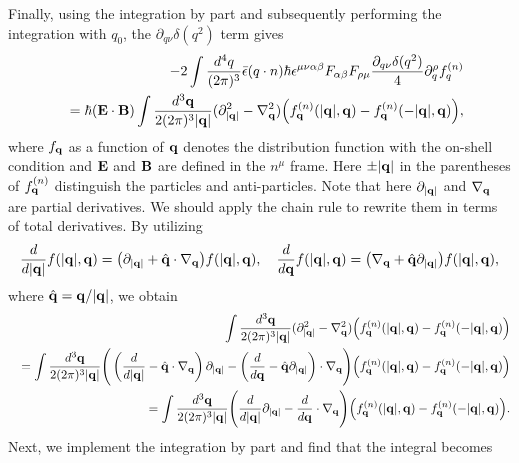 \documentclass[aps,prd,showkeys,preprint,amsmath,amssymb,nofootinbib]{revtex4-1}
\begin{document}
Finally, using the integration by part and subsequently performing the integration with $q_0$, the $\partial_{q\nu}\delta(q^2)$ term gives
\begin{eqnarray}\nonumber\label{chiral_anomaly}
&&-2\int\frac{d^4q}{(2\pi)^3}\bar{\epsilon}(q\cdot n)\hbar\epsilon^{\mu\nu\alpha\beta}F_{\alpha\beta}F_{\rho\mu}\frac{\partial_{q\nu}\delta(q^2)}{4}\partial^{\rho}_qf^{(n)}_q
\\
&&=\hbar({\bf E\cdot B})\int\frac{d^3{\bf q}}{2(2\pi)^3|{\bf q}|}
(\partial^2_{|{\bf q}|}-\nabla^2_{\bf q})\Big(f^{(n)}_{\bf q}(|{\bf q}|,{\bf q})-f^{(n)}_{\bf q}(-|{\bf q}|,{\bf q})\Big),
\end{eqnarray}
where $f_{\bf q}$ as a function of ${\bf q}$ denotes the distribution function with the on-shell condition and ${\bf E}$ and ${\bf B}$ are defined in the $n^{\mu}$ frame. Here $\pm|{\bf q}|$ in the parentheses of $f^{(n)}_{\bf q}$ distinguish the particles and anti-particles. %
Note that here $\partial_{|{\bf q}|}$ and $\nabla_{\bf q}$ are partial derivatives. We should apply the chain rule to rewrite them in terms of total derivatives. By utilizing
\begin{eqnarray}
\frac{d}{d|{\bf q}|}f(|{\bf q}|, {\bf q})=\big(\partial_{|{\bf q}|}+\hat{\bf q}\cdot\nabla_{\bf q}\big)f(|{\bf q}|, {\bf q}),\quad
\frac{d}{d{\bf q}}f(|{\bf q}|, {\bf q})=\big(\nabla_{\bf q}+\hat{\bf q}\partial_{|{\bf q}|}\big)f(|{\bf q}|, {\bf q}),
\end{eqnarray}
where $\hat{\bf q}={\bf q}/|{\bf q}|$,
we obtain
\begin{eqnarray}\nonumber
&&\int\frac{d^3{\bf q}}{2(2\pi)^3|{\bf q}|}
(\partial^2_{|{\bf q}|}-\nabla^2_{\bf q})\Big(f^{(n)}_{\bf q}(|{\bf q}|,{\bf q})-f^{(n)}_{\bf q}(-|{\bf q}|,{\bf q})\Big)
\\\nonumber
&&=\int\frac{d^3{\bf q}}{2(2\pi)^3|{\bf q}|}
\Bigg(\left(\frac{d}{d|{\bf q}|}-\hat{\bf q}\cdot\nabla_{\bf q}\right)\partial_{|{\bf q}|}-\left(\frac{d}{d{\bf q}}-\hat{\bf q}\partial_{|{\bf q}|}\right)\cdot\nabla_{\bf q}\Bigg)\Big(f^{(n)}_{\bf q}(|{\bf q}|,{\bf q})-f^{(n)}_{\bf q}(-|{\bf q}|,{\bf q})\Big)
\\
&&=\int\frac{d^3{\bf q}}{2(2\pi)^3|{\bf q}|}
\Bigg(\frac{d}{d|{\bf q}|}\partial_{|{\bf q}|}-\frac{d}{d{\bf q}}\cdot\nabla_{\bf q}\Bigg)\Big(f^{(n)}_{\bf q}(|{\bf q}|,{\bf q})-f^{(n)}_{\bf q}(-|{\bf q}|,{\bf q})\Big).
\end{eqnarray}
Next, we implement the integration by part and find that the integral becomes
\end{document}
